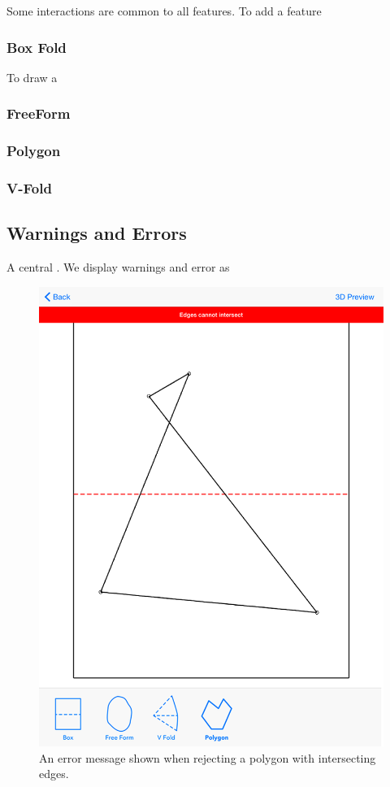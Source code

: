 Some interactions are common to all features. To add a feature

\subsubsection{Box Fold}\label{box-fold}

To draw a

\subsubsection{FreeForm}\label{freeform}

\subsubsection{Polygon}\label{polygon}

\subsubsection{V-Fold}\label{v-fold}

\subsection{Warnings and Errors}\label{warnings-and-errors}

A central . We display warnings and error as

\begin{figure}[htbp]
\centering
\includegraphics{figures/32_UI_Tool_Interactions/error_message.png}
\caption{An error message shown when rejecting a polygon with
intersecting edges.}
\end{figure}


